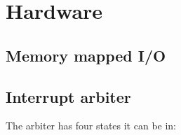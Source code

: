 \chapter*{Hardware}

\section*{Memory mapped I/O}

\section*{Interrupt arbiter}

The arbiter has four states it can be in:

